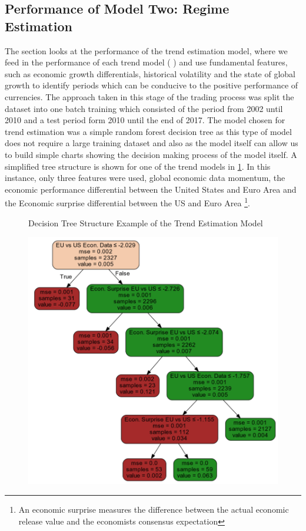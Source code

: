 \documentclass[11pt]{article}
\begin{document}
\subsection{Performance of Model Two: Regime Estimation}
The section looks at the performance of the trend estimation model, where we feed in the performance of each trend model ( \label{model1}) and use fundamental features, such as economic growth differentials, historical volatility and the state of global growth to identify periods which can be conducive to the positive performance of currencies. The approach taken in this stage of the trading process was split the dataset into one batch training which consisted of the period from 2002 until 2010 and a test period form 2010 until the end of 2017. The model chosen for trend estimation was a simple random forest decision tree as this type of model does not require a large training dataset and also as the model itself can allow us to build simple charts showing the decision making process of the model itself. A simplified tree structure is shown for one of the trend models in \ref{fig:decision_tree_model}. In this instance, only three features were used, global economic data momentum, the economic performance differential between the United States and Euro Area and the Economic surprise differential between the US and Euro Area \footnote{An economic surprise measures the difference between the actual economic release value and the economists consensus expectation}.
\begin{figure}[h]
    \centering
	\caption{Decision Tree Structure Example of the Trend Estimation Model}    
	\includegraphics[width=1\textwidth]{decision_tree_model}
    \label{fig:decision_tree_model}
     \caption*{}
\end{figure}
\end{document}
